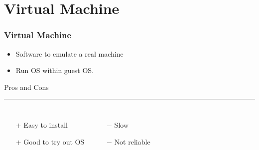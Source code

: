 \section{Virtual Machine}
\begin{frame}
	\frametitle{Virtual Machine}

    \begin{itemize}
    	\item Software to emulate a real machine
        \item Run OS within guest OS.
    \end{itemize} \vspace{0.5cm}
    
    Pros and Cons \vspace{0.1cm}
    \hrule 
    \begin{columns}[c]
            \begin{enumerate}
            	\item[$+$] Easy to install
                \item[$+$] Good  to try out OS
            \end{enumerate}
            \begin{enumerate}
            	\item[$-$] Slow
                \item[$-$] Not reliable
            \end{enumerate}
    \end{columns} \vspace{0.5cm}
	
	\begin{itemize}
		\item[] 
		\item[] 
	\end{itemize}
    
\end{frame}


